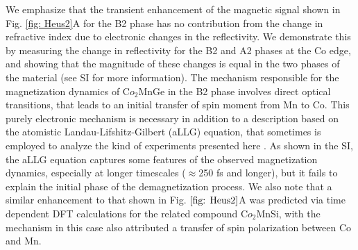 We emphasize that the transient enhancement of the magnetic signal shown in Fig. \ref{fig: Heus2}A for the B2 phase has no contribution from the change in refractive index due to electronic changes in the reflectivity. We demonstrate this by measuring the change in reflectivity for the B2 and A2 phases at the Co edge, and showing that the magnitude of these changes is equal in the two phases of the material (see SI for more information). The mechanism responsible for the magnetization dynamics of C$o_2$MnGe in the B2 phase involves direct optical transitions, that leads to an initial transfer of spin moment from Mn to Co. This purely electronic mechanism is necessary in addition to a description based on the atomistic Landau-Lifshitz-Gilbert (aLLG) equation, that sometimes is employed to analyze the kind of experiments presented here \cite{Evans2015,Hofherr2018}. As shown in the SI, the aLLG equation captures some features of the observed magnetization dynamics, especially at longer timescales ($\approx$250 fs and longer), but it fails to explain the initial phase of the demagnetization process. We also note that a similar enhancement to that shown in Fig. $\ref{fig: Heus2}$A was predicted via time dependent DFT calculations for the related compound C$o_2$MnSi, with the mechanism in this case also attributed a transfer of spin polarization between  Co and Mn\cite{Elliott2016}.


